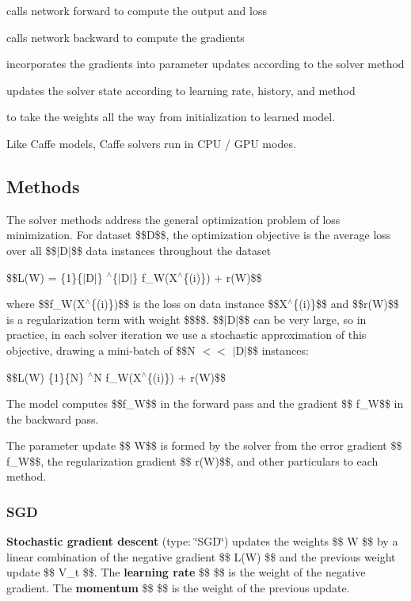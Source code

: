 \begin{DoxyEnumerate}
\item calls network forward to compute the output and loss
\item calls network backward to compute the gradients
\item incorporates the gradients into parameter updates according to the solver method
\item updates the solver state according to learning rate, history, and method
\end{DoxyEnumerate}

to take the weights all the way from initialization to learned model.

Like Caffe models, Caffe solvers run in C\+PU / G\+PU modes.

\subsection*{Methods}

The solver methods address the general optimization problem of loss minimization. For dataset \$\$D\$\$, the optimization objective is the average loss over all \$\$$\vert$\+D$\vert$\$\$ data instances throughout the dataset

\$\$\+L(\+W) = \{1\}\{$\vert$\+D$\vert$\} $^\wedge$\{$\vert$\+D$\vert$\} f\+\_\+W(X$^\wedge$\{(i)\}) +  r(\+W)\$\$

where \$\$f\+\_\+W(X$^\wedge$\{(i)\})\$\$ is the loss on data instance \$\$X$^\wedge$\{(i)\}\$\$ and \$\$r(\+W)\$\$ is a regularization term with weight \$\$\$\$. \$\$$\vert$\+D$\vert$\$\$ can be very large, so in practice, in each solver iteration we use a stochastic approximation of this objective, drawing a mini-\/batch of \$\$N $<$$<$ $\vert$\+D$\vert$\$\$ instances\+:

\$\$\+L(\+W)  \{1\}\{N\} $^\wedge$N f\+\_\+W(X$^\wedge$\{(i)\}) +  r(\+W)\$\$

The model computes \$\$f\+\_\+W\$\$ in the forward pass and the gradient \$\$ f\+\_\+W\$\$ in the backward pass.

The parameter update \$\$ W\$\$ is formed by the solver from the error gradient \$\$ f\+\_\+W\$\$, the regularization gradient \$\$ r(\+W)\$\$, and other particulars to each method.

\subsubsection*{S\+GD}

{\bfseries Stochastic gradient descent} ({\ttfamily type\+: \char`\"{}\+S\+G\+D\char`\"{}}) updates the weights \$\$ W \$\$ by a linear combination of the negative gradient \$\$  L(\+W) \$\$ and the previous weight update \$\$ V\+\_\+t \$\$. The {\bfseries learning rate} \$\$  \$\$ is the weight of the negative gradient. The {\bfseries momentum} \$\$  \$\$ is the weight of the previous update.

